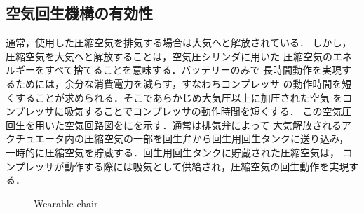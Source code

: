 \subsection{空気回生機構の有効性}
通常，使用した圧縮空気を排気する場合は大気へと解放されている．
しかし，圧縮空気を大気へと解放することは，空気圧シリンダに用いた
圧縮空気のエネルギーをすべて捨てることを意味する．バッテリーのみで
長時間動作を実現するためには，余分な消費電力を減らす，すなわちコンプレッサ
の動作時間を短くすることが求められる．そこであらかじめ大気圧以上に加圧された空気
をコンプレッサに吸気することでコンプレッサの動作時間を短くする．
この空気圧回生を用いた空気回路図をにを示す．通常は排気弁によって
大気解放されるアクチュエータ内の圧縮空気の一部を回生弁から回生用回生タンクに送り込み，
一時的に圧縮空気を貯蔵する．回生用回生タンクに貯蔵された圧縮空気は，
コンプレッサが動作する際には吸気として供給され，圧縮空気の回生動作を実現する．
\begin{figure}[t]%
        \begin{center}%
         \caption{Wearable chair}%
         \vspace{-6mm}
 \end{center}%
\end{figure}%
